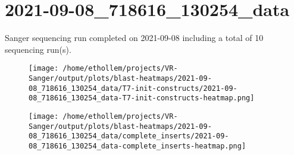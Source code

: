 \section{2021-09-08\_718616\_130254\_data}

    Sanger sequencing run completed on 2021-09-08
    including a total of 10 sequencing
    run(s).
    

    \begin{figure}[!h]
        \texttt{[image: /home/ethollem/projects/VR-Sanger/output/plots/blast-heatmaps/2021-09-08\_718616\_130254\_data/T7-init-constructs/2021-09-08\_718616\_130254\_data-T7-init-constructs-heatmap.png]}
        \centering
    \end{figure}


    \begin{figure}[!h]
        \texttt{[image: /home/ethollem/projects/VR-Sanger/output/plots/blast-heatmaps/2021-09-08\_718616\_130254\_data/complete\_inserts/2021-09-08\_718616\_130254\_data-complete\_inserts-heatmap.png]}
        \centering
    \end{figure}

\pagebreak